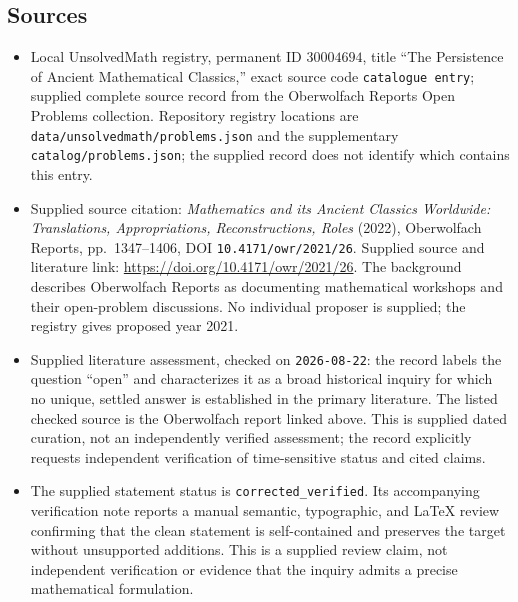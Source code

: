 \documentclass[11pt]{article}
\begin{document}
\subsection{Sources}
\begin{itemize}
\item Local UnsolvedMath registry, permanent ID \(30004694\), title ``The Persistence of Ancient Mathematical Classics,'' exact source code \texttt{catalogue entry}; supplied complete source record from the Oberwolfach Reports Open Problems collection. Repository registry locations are \texttt{data/unsolvedmath/problems.json} and the supplementary \texttt{catalog/problems.json}; the supplied record does not identify which contains this entry.
\item Supplied source citation: \emph{Mathematics and its Ancient Classics Worldwide: Translations, Appropriations, Reconstructions, Roles} (2022), Oberwolfach Reports, pp.\ 1347--1406, DOI \texttt{10.4171/owr/2021/26}. Supplied source and literature link: \url{https://doi.org/10.4171/owr/2021/26}. The background describes Oberwolfach Reports as documenting mathematical workshops and their open-problem discussions. No individual proposer is supplied; the registry gives proposed year 2021.
\item Supplied literature assessment, checked on \texttt{2026-08-22}: the record labels the question ``open'' and characterizes it as a broad historical inquiry for which no unique, settled answer is established in the primary literature. The listed checked source is the Oberwolfach report linked above. This is supplied dated curation, not an independently verified assessment; the record explicitly requests independent verification of time-sensitive status and cited claims.
\item The supplied statement status is \texttt{corrected\_verified}. Its accompanying verification note reports a manual semantic, typographic, and LaTeX review confirming that the clean statement is self-contained and preserves the target without unsupported additions. This is a supplied review claim, not independent verification or evidence that the inquiry admits a precise mathematical formulation.
\end{itemize}
\end{document}
